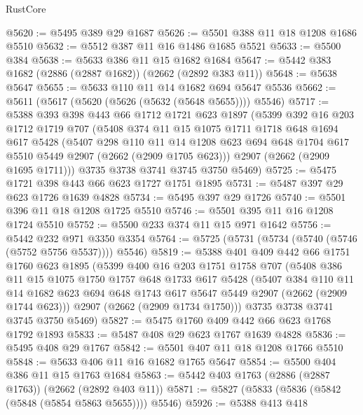 \begin{lexlean}{RustCore}
\begin{coremodule}
@5620 := @5495 @389 @29 @1687
@5626 := @5501 @388 @11 @18 @1208 @1686 @5510
@5632 := @5512 @387 @11 @16 @1486 @1685 @5521
@5633 := @5500 @384
@5638 := @5633 @386 @11 @15 @1682 @1684
@5647 := @5442 @383 @1682 (@2886 (@2887 @1682)) (@2662 (@2892 @383 @11))
@5648 := @5638 @5647
@5655 := @5633 @110 @11 @14 @1682 @694 @5647 @5536
@5662 := @5611 (@5617 (@5620 (@5626 (@5632 (@5648 @5655)))) @5546)
@5717 := @5388
    @393
    @398
    @443
    @66
    @1712
    @1721
    @623
    @1897
    (@5399
      @392
      @16
      @203
      @1712
      @1719
      @707
      (@5408
        @374
        @11
        @15
        @1075
        @1711
        @1718
        @648
        @1694
        @617
        @5428
        (@5407
          @298
          @110
          @11
          @14
          @1208
          @623
          @694
          @648
          @1704
          @617
          @5510
          @5449
          @2907
          (@2662 (@2909 @1705 @623)))
        @2907
        (@2662 (@2909 @1695 @1711)))
      @3735
      @3738
      @3741
      @3745
      @3750
      @5469)
@5725 := @5475 @1721 @398 @443 @66 @623 @1727 @1751 @1895
@5731 := @5487 @397 @29 @623 @1726 @1639 @4828
@5734 := @5495 @397 @29 @1726
@5740 := @5501 @396 @11 @18 @1208 @1725 @5510
@5746 := @5501 @395 @11 @16 @1208 @1724 @5510
@5752 := @5500 @233 @374 @11 @15 @971 @1642
@5756 := @5442 @232 @971 @3350 @3354
@5764 := @5725 (@5731 (@5734 (@5740 (@5746 (@5752 @5756 @5537)))) @5546)
@5819 := @5388
    @401
    @409
    @442
    @66
    @1751
    @1760
    @623
    @1895
    (@5399
      @400
      @16
      @203
      @1751
      @1758
      @707
      (@5408
        @386
        @11
        @15
        @1075
        @1750
        @1757
        @648
        @1733
        @617
        @5428
        (@5407
          @384
          @110
          @11
          @14
          @1682
          @623
          @694
          @648
          @1743
          @617
          @5647
          @5449
          @2907
          (@2662 (@2909 @1744 @623)))
        @2907
        (@2662 (@2909 @1734 @1750)))
      @3735
      @3738
      @3741
      @3745
      @3750
      @5469)
@5827 := @5475 @1760 @409 @442 @66 @623 @1768 @1792 @1893
@5833 := @5487 @408 @29 @623 @1767 @1639 @4828
@5836 := @5495 @408 @29 @1767
@5842 := @5501 @407 @11 @18 @1208 @1766 @5510
@5848 := @5633 @406 @11 @16 @1682 @1765 @5647
@5854 := @5500 @404 @386 @11 @15 @1763 @1684
@5863 := @5442 @403 @1763 (@2886 (@2887 @1763)) (@2662 (@2892 @403 @11))
@5871 := @5827 (@5833 (@5836 (@5842 (@5848 (@5854 @5863 @5655)))) @5546)
@5926 := @5388
    @413
    @418

\end{coremodule}
\end{lexlean}
